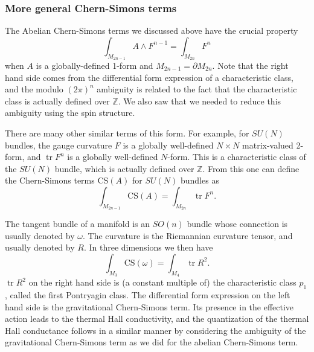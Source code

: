 \documentclass[12pt]{article}
\numberwithin{equation}{section}
\numberwithin{figure}{section}
\theoremstyle{remark}
\def\bZ{\mathbb{Z}}
\def\tr{\mathop{\mathrm{tr}}\nolimits}
\begin{document}
\subsubsection{More general Chern-Simons terms}
The Abelian Chern-Simons terms we discussed above have the crucial property
\begin{equation}
\int_{M_{2n-1}} A\wedge F^{n-1} = \int_{M_{2n}} F^n
\end{equation} when $A$ is a globally-defined 1-form
and $M_{2n-1}=\partial M_{2n}$.
Note that the right hand side comes from the differential form expression
of a characteristic class,
and the modulo $(2\pi)^n$ ambiguity is related to the fact that 
the characteristic class is actually defined over $\bZ$. 
We also saw that we needed to reduce this ambiguity using the spin structure.

There are many other similar terms of this form.
For example, for $SU(N)$ bundles, 
the gauge curvature $F$ is a globally well-defined $N\times N$ matrix-valued 2-form,
and $\tr F^n$ is a globally well-defined $N$-form.
This is a characteristic class of the $SU(N)$ bundle,
which is actually defined over $\bZ$.
From this one can define the Chern-Simons terms $\mathrm{CS}(A)$ for $SU(N)$ bundles
as \begin{equation}
\int_{M_{2n-1}} \mathrm{CS}(A) = \int_{M_{2n}} \tr F^{n}.
\end{equation}

The tangent bundle of a manifold is an $SO(n)$ bundle
whose connection is usually denoted by $\omega$.
The curvature is the Riemannian curvature tensor, and usually denoted by $R$.
In three dimensions we then have \begin{equation}
\int_{M_3} \mathrm{CS}(\omega) = \int_{M_4} \tr R^2.
\end{equation}
$\tr R^2$ on the right hand side is (a constant multiple of)
the characteristic class $p_1$, called the first Pontryagin class.
The differential form expression on the left hand side is the gravitational Chern-Simons term.
Its presence in the effective action leads to the thermal Hall conductivity,
and the quantization of the thermal Hall conductance
follows in a similar manner 
by considering the ambiguity of the gravitational Chern-Simons term 
as we did for the abelian Chern-Simons term.
\end{document}
